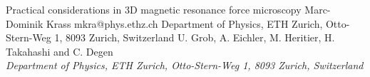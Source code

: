 \begin{conf-abstract}[]
{Practical considerations in 3D magnetic resonance force microscopy}
{\color{blue} Marc-Dominik Krass}
{mkra@phys.ethz.ch}
{Department of Physics, ETH Zurich, Otto-Stern-Weg 1, 8093 Zurich, Switzerland}
{{\color{blue}U. Grob, A. Eichler, M. Heritier, H. Takahashi and C. Degen}\\ \textit{Department of Physics, ETH Zurich, Otto-Stern-Weg 1, 8093 Zurich, Switzerland}\\ 
\decofourleft \decofourright}





\printbibliography[heading=none]

\end{conf-abstract}

